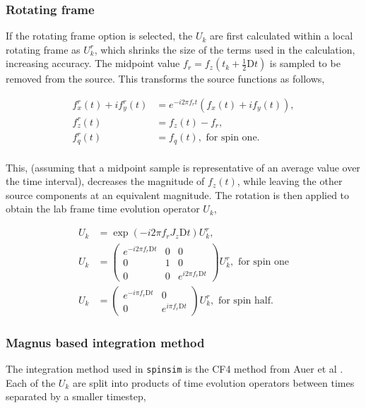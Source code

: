 \documentclass{jors}
\begin{document}
		\subsubsection*{Rotating frame}
			If the rotating frame option is selected, the \(U_k\) are first calculated within a local rotating frame as \(U^r_k\), which shrinks the size of the terms used in the calculation, increasing accuracy. The midpoint value \(f_r = f_z(t_k + \frac12\mathrm{D}t)\) is sampled to be removed from the source. This transforms the source functions as follows,
			
			\begin{align*}
				f^r_x(t) + if^r_y(t) &= e^{-i 2\pi f_r t}(f_x(t) + if_y(t)),\\
				f^r_z(t) &= f_z(t) - f_r,\\
				f^r_q(t) &= f_q(t), \textrm{ for spin one.}\\
			\end{align*}
			
			This, (assuming that a midpoint sample is representative of an average value over the time interval), decreases the magnitude of \(f_z(t)\), while leaving the other source components at an equivalent magnitude. The rotation is then applied to obtain the lab frame time evolution operator \(U_k\),
			
			\begin{align*}
				U_k &= \exp(-i 2 \pi f_r J_z \mathrm{D}t) U^r_k,\\
				U_k &= \begin{pmatrix}
					e^{-i 2\pi f_r \mathrm{D}t} & 0 & 0\\
					0 & 1 & 0\\
					0 & 0 & e^{i 2\pi f_r \mathrm{D}t}
				\end{pmatrix} U^r_k, \textrm{ for spin one}\\
				U_k &= \begin{pmatrix}
					e^{-i \pi f_r \mathrm{D}t} & 0\\
					0 & e^{i \pi f_r \mathrm{D}t}
				\end{pmatrix} U^r_k, \textrm{ for spin half.}
			\end{align*}
			
		\subsubsection*{Magnus based integration method}
			The integration method used in \texttt{spinsim} is the CF4 method from Auer et al \cite{auer_magnus_2018}. Each of the \(U_k\) are split into products of time evolution operators between times separated by a smaller timestep,
			
\end{document}
